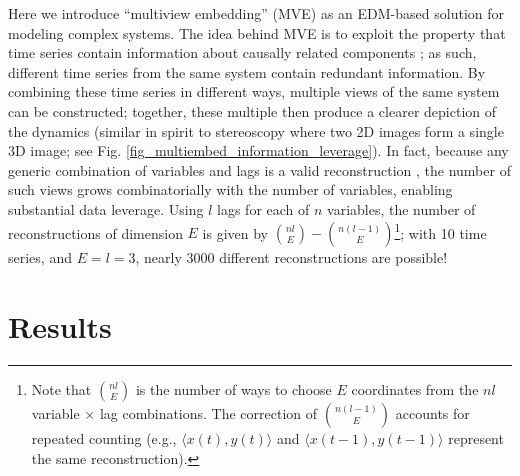 Here we introduce ``multiview embedding'' (MVE) as an EDM-based solution for modeling complex systems. The idea behind MVE is to exploit the property that time series contain information about causally related components \cite{Sugihara_2012}; as such, different time series from the same system contain redundant information. By combining these time series in different ways, multiple views of the same system can be constructed; together, these multiple then produce a clearer depiction of the dynamics (similar in spirit to stereoscopy where two 2D images form a single 3D image; see Fig. \ref{fig_multiembed_information_leverage}). In fact, because any generic combination of variables and lags is a valid reconstruction \cite{Sauer_1991, Deyle_2011}, the number of such views grows combinatorially with the number of variables, enabling substantial data leverage. Using $l$ lags for each of $n$ variables, the number of reconstructions of dimension $E$ is given by ${n l \choose E} - {n (l-1) \choose E}$\footnote{Note that ${n l \choose E}$ is the number of ways to choose $E$ coordinates from the $n l$ variable $\times$ lag combinations. The correction of ${n (l-1) \choose E}$ accounts for repeated counting (e.g., $\langle x(t), y(t) \rangle$ and $\langle x(t-1), y(t-1) \rangle$ represent the same reconstruction).}; with 10 time series, and $E = l = 3$, nearly 3000 different reconstructions are possible!

\section{Results}

